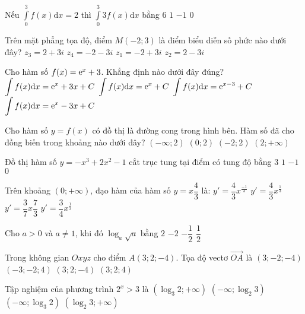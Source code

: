 \begin{ex}%
Nếu $\displaystyle\int\limits_0^3 f(x) \mathrm{d} x=2$ thì $\displaystyle\int\limits_0^3 3 f(x) \mathrm{d} x$ bằng
\choice
{\True $6$}
{$1$}
{$-1$}
{$0$}

\end{ex}
\begin{ex}%
Trên mặt phẳng tọa độ, điểm $M(-2; 3)$ là điểm biểu diễn số phức nào dưới đây?
\choice
{$z_3=2+3 i$}
{$z_4=-2-3 i$}
{\True $z_1=-2+3 i$}
{$z_2=2-3 i$}

\end{ex}
\begin{ex}%
Cho hàm số $f(x)={\rm e}^{x}+3$. Khẳng định nào dưới đây đúng?
\choice
{\True $\displaystyle\int f(x) \mathrm{d} x={\rm e}^{x}+3 x+C$}
{$\displaystyle\int f(x) \mathrm{d} x={\rm e}^{x}+C$}
{$\displaystyle\int f(x) \mathrm{d} x={\rm e}^{x-3}+C$}
{$\displaystyle\int f(x) \mathrm{d} x={\rm e}^{x}-3 x+C$}

\end{ex}
\begin{ex}%
Cho hàm số $y=f(x)$ có đồ thị là đường cong trong hình bên. Hàm số đã cho đồng biến trong khoảng nào dưới đây?
\choice
{$(-\infty; 2)$}
{\True $(0; 2)$}
{$(-2; 2)$}
{$(2;+\infty)$}

\end{ex}
\begin{ex}%
Đồ thị hàm số $y=-x^3+2 x^2-1$ cắt trục tung tại điểm có tung độ bằng
\choice
{$3$}
{$1$}
{\True $-1$}
{$0$}

\end{ex}
\begin{ex}%
Trên khoảng $(0;+\infty)$, đạo hàm của hàm số $y=x \dfrac{4}{3}$ là:
\choice
{$y'=\dfrac{4}{3} x^{\frac{-1}{3}}$}
{\True $y'=\dfrac{4}{3} x^{\frac{1}{3}}$}
{$y'=\dfrac{3}{7} x \dfrac{7}{3}$}
{$y'=\dfrac{3}{4} x^{\frac{1}{3}}$}

\end{ex}
\begin{ex}%
Cho $a>0$ và $a \neq 1$, khi đó $\log_a \sqrt{a}$ bằng
\choice
{$2$}
{$-2$}
{$-\dfrac{1}{2}$}
{\True $\dfrac{1}{2}$}

\end{ex}
\begin{ex}%
Trong không gian $O x y z$ cho điểm $A(3; 2;-4)$. Tọa độ vectơ $\overrightarrow{OA}$ là
\choice
{$(3;-2;-4)$}
{$(-3;-2; 4)$}
{\True $(3; 2;-4)$}
{$(3; 2; 4)$}

\end{ex}
\begin{ex}%
Tập nghiệm của phương trình $2^{x}>3$ là
\choice
{$\left(\log_3 2;+\infty\right)$}
{$\left(-\infty; \log_2 3\right)$}
{$\left(-\infty; \log_3 2\right)$}
{\True $\left(\log_2 3;+\infty\right)$}

\end{ex}
